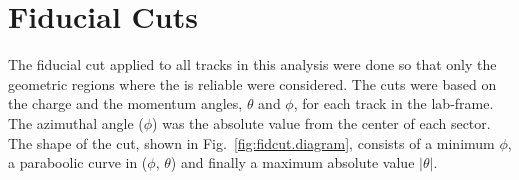 \chapter{\label{sec:app.fidcut}Fiducial Cuts}

The fiducial cut applied to all tracks in this analysis were done so that only the geometric regions where the  is reliable were considered. The cuts were based on the charge and the momentum angles, $\theta$ and $\phi$, for each track in the lab-frame. The azimuthal angle ($\phi$) was the absolute value from the center of each  sector. The shape of the cut, shown in Fig.~\ref{fig:fidcut.diagram}, consists of a minimum $\phi$, a paraboolic curve in ($\phi$, $\theta$) and finally a maximum absolute value $|\theta|$.
